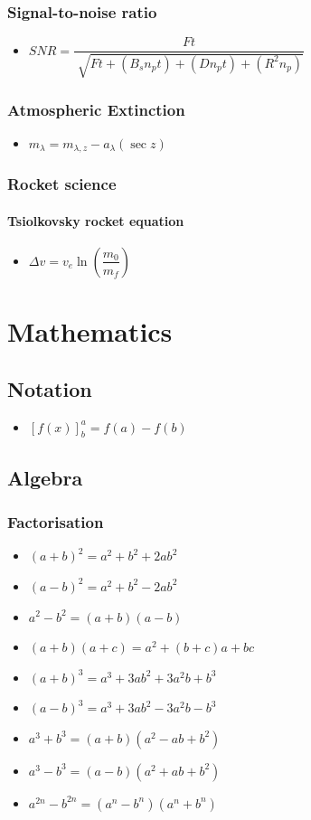 \documentclass[]{report}
\newcommand \tab[1][1cm]{\hspace*{#1}}
\newcommand{\itemt}{\item \tab}
\begin{document}
\subsection{Signal-to-noise ratio}
\begin{itemize}
\itemt \( SNR = \dfrac{Ft}{\sqrt[]{Ft + (B_s n_p t) + (D n_p t) + (R^2 n_p)}} \)
\end{itemize}

\subsection{Atmospheric Extinction}
\begin{itemize}
\itemt \( m_{\lambda} = m_{\lambda,z} - a_\lambda (\sec z) \)
\end{itemize}


\subsection{Rocket science}

\subsubsection{Tsiolkovsky rocket equation}
\begin{itemize}
\itemt \( \Delta v = v_e \ln(\dfrac{m_0}{m_f}) \)
\end{itemize}





\chapter{Mathematics}



	\section{Notation}
\begin{itemize}
\itemt \( [f(x)]^a_b = f(a) - f(b)\)
\end{itemize}


	\section{Algebra}

\subsection{Factorisation}
\begin{itemize}
\itemt \( (a+b)^2 = a^2 + b^2 + 2ab^2 \)
\itemt \( (a-b)^2 = a^2 + b^2 - 2ab^2 \)
\itemt \( a^2-b^2 = (a+b)(a-b) \)
\itemt \( (a+b)(a+c) = a^2 + (b+c)a + bc \)
\itemt \( (a+b)^3 = a^3 +3ab^2 + 3a^2b + b^3 \)
\itemt \( (a-b)^3 = a^3 + 3ab^2 - 3a^2b - b^3 \)
\itemt \( a^3 + b^3 = (a+b)(a^2-ab+b^2) \)
\itemt \( a^3 - b^3 = (a-b)(a^2 + ab + b^2) \)
\itemt \( a^{2n} - b^{2n} = (a^n - b^n)(a^n + b^n) \)
\end{itemize}
\end{document}
